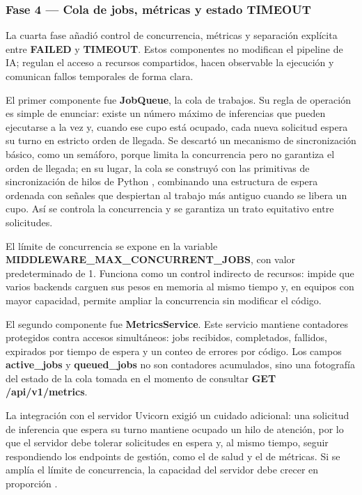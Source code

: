 \documentclass[11pt,a4paper]{article}
\begin{document}
\subsubsection{Fase 4 — Cola de jobs, métricas y estado TIMEOUT}

La cuarta fase añadió control de concurrencia, métricas y separación explícita entre \textbf{FAILED} y \textbf{TIMEOUT}. Estos componentes no modifican el pipeline de IA; regulan el acceso a recursos compartidos, hacen observable la ejecución y comunican fallos temporales de forma clara.

El primer componente fue \textbf{JobQueue}, la cola de trabajos. Su regla de operación es simple de enunciar: existe un número máximo de inferencias que pueden ejecutarse a la vez y, cuando ese cupo está ocupado, cada nueva solicitud espera su turno en estricto orden de llegada. Se descartó un mecanismo de sincronización básico, como un semáforo, porque limita la concurrencia pero no garantiza el orden de llegada; en su lugar, la cola se construyó con las primitivas de sincronización de hilos de Python \cite{python_threading}, combinando una estructura de espera ordenada con señales que despiertan al trabajo más antiguo cuando se libera un cupo. Así se controla la concurrencia y se garantiza un trato equitativo entre solicitudes.

El límite de concurrencia se expone en la variable \textbf{MIDDLEWARE\_MAX\_CONCURRENT\_JOBS}, con valor predeterminado de 1. Funciona como un control indirecto de recursos: impide que varios backends carguen sus pesos en memoria al mismo tiempo y, en equipos con mayor capacidad, permite ampliar la concurrencia sin modificar el código.

El segundo componente fue \textbf{MetricsService}. Este servicio mantiene contadores protegidos contra accesos simultáneos: jobs recibidos, completados, fallidos, expirados por tiempo de espera y un conteo de errores por código. Los campos \textbf{active\_jobs} y \textbf{queued\_jobs} no son contadores acumulados, sino una fotografía del estado de la cola tomada en el momento de consultar \textbf{GET /api/v1/metrics}.

La integración con el servidor Uvicorn exigió un cuidado adicional: una solicitud de inferencia que espera su turno mantiene ocupado un hilo de atención, por lo que el servidor debe tolerar solicitudes en espera y, al mismo tiempo, seguir respondiendo los endpoints de gestión, como el de salud y el de métricas. Si se amplía el límite de concurrencia, la capacidad del servidor debe crecer en proporción \cite{uvicorn_docs}.
\end{document}
